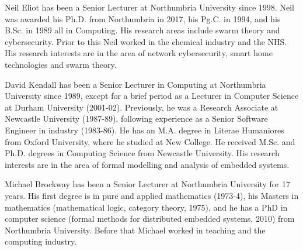 \documentclass{ieeeaccess}
\begin{document}



\begin{IEEEbiography}{Neil Eliot}
has been a Senior Lecturer at Northumbria University since 1998.  Neil was awarded his Ph.D. from Northumbria in 2017, his Pg.C. in 1994, and his B.Sc. in 1989 all in Computing. His research areas include swarm theory and cybersecurity. Prior to this Neil worked in the chemical industry and the NHS. His research interests are in the area of network cybersecurity, smart home technologies and swarm theory. 
\end{IEEEbiography}

\begin{IEEEbiography}{David Kendall}
has been a Senior Lecturer in Computing at Northumbria University since 1989, except for a brief period as a Lecturer in Computer Science at Durham University (2001-02). Previously, he was a Research Associate at Newcastle University (1987-89), following experience as a Senior Software Engineer in industry (1983-86). He has an M.A. degree in Literae Humaniores from Oxford University, where he studied at New College. He received M.Sc. and Ph.D. degrees in Computing Science from Newcastle University. His research interests are in the area of formal modelling and analysis of embedded systems. 
\end{IEEEbiography}

\begin{IEEEbiography}{Michael Brockway}
has been a Senior Lecturer at Northumbria University for 17 years. His first degree is in pure and applied mathematics (1973-4), his Masters in mathematics (mathematical logic, category theory, 1975), and he has a PhD in computer science (formal methods for distributed embedded systems, 2010) from Northumbria University. Before that Michael worked in teaching and the computing industry.
\end{IEEEbiography}

\EOD
\end{document}
